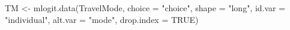 TM <- mlogit.data(TravelMode, choice = "choice", shape = "long",
                 id.var = "individual", alt.var = "mode", drop.index = TRUE)
